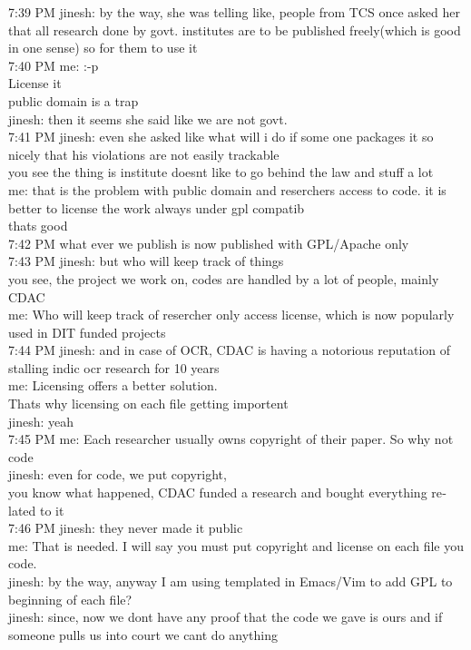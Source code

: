 \begin{english}
7:39 PM jinesh: by the way, she was telling like, people from TCS once asked her that all research done by govt. institutes are to be published freely(which is good in one sense) so for them to use it\\
7:40 PM me: :-p\\
  License it\\
  public domain is a trap\\
 jinesh: then it seems she said like we are not govt.\\
7:41 PM jinesh: even she asked like what will i do if some one packages it so nicely that his violations are not easily trackable\\
  you see the thing is institute doesnt like to go behind the law and stuff a lot\\
 me: that is the problem with public domain and reserchers access to code. it is better to license the work always under gpl compatib\\
  thats good\\
7:42 PM what ever we publish is now published with GPL/Apache only\\
7:43 PM jinesh: but who will keep track of things\\
  you see, the project we work on, codes are handled by a lot of people, mainly CDAC\\
 me: Who will keep track of resercher only access license, which is now popularly used in DIT funded projects\\
7:44 PM jinesh: and in case of OCR, CDAC is having a notorious reputation of stalling indic ocr research for 10 years\\
 me: Licensing offers a better solution. \\
  Thats why licensing on each file getting importent\\
 jinesh: yeah\\
7:45 PM me: Each researcher usually owns copyright of their paper. So why not code\\
 jinesh: even for code, we put copyright,\\
  you know what happened, CDAC funded a research and bought everything related to it\\
7:46 PM jinesh: they never made it public\\
 me: That is needed. I will say you must put copyright and license on each file you code. \\
 jinesh: by the way, anyway  I am using templated in Emacs/Vim to add GPL to beginning of each file?\\
 jinesh: since, now we dont have any proof that the code we gave is ours and if someone pulls us into court we cant do anything\\
\end{english}

